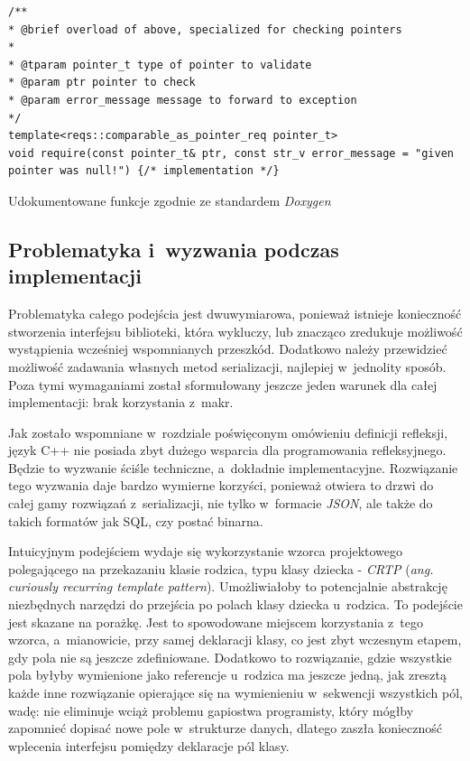 \documentclass[12pt]{article}
\newcommand{\n}{\newline}
\newcommand{\nonpl}[1]{{\it #1}}
\newcommand{\ang}[1]{\nonpl{ang. #1}}
\newcommand{\JSON}{\nonpl{JSON}}
\begin{document}
{{{\begin{captioned}[H]
\begin{lstlisting}[frame=single]
/**
* @brief overload of above, specialized for checking pointers
*
* @tparam pointer_t type of pointer to validate
* @param ptr pointer to check
* @param error_message message to forward to exception
*/
template<reqs::comparable_as_pointer_req pointer_t>
void require(const pointer_t& ptr, const str_v error_message = "given pointer was null!") {/* implementation */}
					\end{lstlisting}
					\caption{ Udokumentowane funkcje zgodnie ze standardem \nonpl{Doxygen}}
					\label{doxygen_code}
				\end{captioned}
			}
		}

		{
			\subsection{Problematyka i~wyzwania podczas implementacji}

			Problematyka całego podejścia jest dwuwymiarowa, ponieważ istnieje konieczność stworzenia interfejsu biblioteki, która wykluczy, lub znacząco
			zredukuje możliwość wystąpienia wcześniej wspomnianych przeszkód. Dodatkowo należy przewidzieć możliwość zadawania własnych metod serializacji,
			najlepiej w~jednolity sposób. Poza tymi wymaganiami został sformułowany jeszcze jeden warunek dla całej implementacji: brak korzystania z~makr.\n

			Jak zostało wspomniane w~rozdziale poświęconym omówieniu definicji refleksji, język C++ nie posiada zbyt dużego wsparcia dla programowania
			refleksyjnego. Będzie to wyzwanie ściśle techniczne, a~dokładnie implementacyjne. Rozwiązanie tego wyzwania daje bardzo wymierne korzyści,
			ponieważ otwiera to drzwi do całej gamy rozwiązań z~serializacji, nie tylko w~formacie \JSON, ale także do takich formatów jak SQL, czy
			postać binarna.

			Intuicyjnym podejściem wydaje się wykorzystanie wzorca projektowego polegającego na przekazaniu klasie rodzica, typu klasy dziecka - \nonpl{CRTP}
			(\ang{curiously recurring template pattern}). Umożliwiałoby to potencjalnie abstrakcję niezbędnych narzędzi do przejścia po polach klasy dziecka u~rodzica.
			To podejście jest skazane na porażkę. Jest to spowodowane miejscem korzystania z~tego wzorca, a~mianowicie, przy samej deklaracji klasy, co jest zbyt wczesnym etapem,
			gdy pola nie są jeszcze zdefiniowane. Dodatkowo to rozwiązanie, gdzie wszystkie pola byłyby wymienione jako referencje u~rodzica ma jeszcze jedną, jak zresztą każde
			inne rozwiązanie opierające się na wymienieniu w~sekwencji wszystkich pól, wadę: nie eliminuje wciąż problemu gapiostwa programisty, który mógłby zapomnieć
			dopisać nowe pole w~strukturze danych, dlatego zaszła konieczność wplecenia interfejsu pomiędzy deklaracje pól klasy.
		}

}
\end{document}
